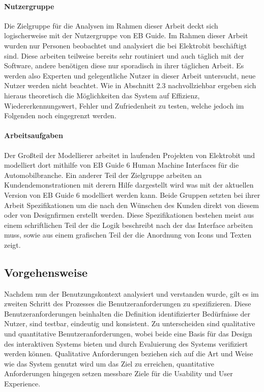 \paragraph{Nutzergruppe}
Die Zielgruppe für die Analysen im Rahmen dieser Arbeit deckt sich logischerweise mit der Nutzergruppe von EB Guide.
Im Rahmen dieser Arbeit wurden nur Personen beobachtet und analysiert die bei Elektrobit beschäftigt sind.
Diese arbeiten teilweise bereits sehr routiniert und auch täglich mit der Software, andere benötigen diese nur sporadisch in ihrer täglichen Arbeit.
Es werden also Experten und gelegentliche Nutzer in dieser Arbeit untersucht, neue Nutzer werden nicht beachtet.
Wie in Abschnitt 2.3 nachvollziehbar ergeben sich hieraus theoretisch die Möglichkeiten das System auf Effizienz, Wiedererkennungswert, Fehler und Zufriedenheit zu testen, welche jedoch im Folgenden noch eingegrenzt werden.

\paragraph{Arbeitsaufgaben}
Der Großteil der Modellierer arbeitet in laufenden Projekten von Elektrobit und modelliert dort mithilfe von EB Guide 6 Human Machine Interfaces für die Automobilbranche.
Ein anderer Teil der Zielgruppe arbeiten an Kundendemonstrationen mit derern Hilfe dargestellt wird was mit der aktuellen Version von EB Guide 6 modelliert werden kann.
Beide Gruppen setzten bei ihrer Arbeit Spezifikationen um die nach den Wünschen des Kunden direkt von diesem oder von Designfirmen erstellt werden.
Diese Spezifikationen bestehen meist aus einem schriftlichen Teil der die Logik beschreibt nach der das Interface arbeiten muss, sowie aus einem grafischen Teil der die Anordnung von Icons und Texten zeigt.


\subsection{Vorgehensweise}
Nachdem nun der Benutzungskontext analysiert und verstanden wurde, gilt es im zweiten Schritt des Prozesses die Benutzeranforderungen zu spezifizieren.
Diese Benutzeranforderungen beinhalten die Definition identifizierter Bedürfnisse der Nutzer, sind testbar, eindeutig und konsistent.
Zu unterscheiden sind qualitative und quantitative Benutzeranforderungen, wobei beide eine Basis für das Design des interaktiven Systems bieten und durch Evaluierung des Systems verifiziert werden können.
Qualitative Anforderungen beziehen sich auf die Art und Weise wie das System genutzt wird um das Ziel zu erreichen, quantitative Anforderungen hingegen setzen messbare Ziele für die Usability und User Experience.\cite{.f}

